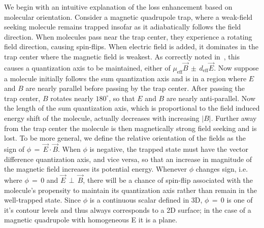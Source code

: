 \documentclass[%
 reprint,
 amsmath,amssymb,
 aps,
prl,
]{revtex4-1}
\newcommand{\epb}{{$\vec{E}\,{\perp}\,\vec{B}$}}
\begin{document}
We begin with an intuitive explanation of the loss enhancement based on molecular orientation.
Consider a magnetic quadrupole trap, where a weak-field seeking molecule remains trapped insofar as it adiabatically follows the field direction. 
When molecules pass near the trap center, they experience a rotating field direction, causing spin-flips. 
When electric field is added, it dominates in the trap center where the magnetic field is weakest. 
As correctly noted in~\cite{Bohn2013}, this causes a quantization axis to be maintained, either of $\mu_\text{eff}\vec{B}\,{\pm}\, d_\text{eff}\vec{E}$.
Now suppose a molecule initially follows the sum quantization axis and is in a region where $E$ and $B$ are nearly parallel before passing by the trap center.
After passing the trap center, $B$ rotates nearly $180^\circ$, so that $E$ and $B$ are nearly anti-parallel. 
Now the length of the sum quantization axis, which is proportional to the field induced energy shift of the molecule, actually decreases with increasing $|B|$.
Further away from the trap center the molecule is then magnetically strong field seeking and is lost. 
To be more general, we define the relative orientation of the fields as the sign of $\phi\,{=}\,\vec{E}\cdot\vec{B}$. 
When $\phi$ is negative, the trapped state must have the vector difference quantization axis, and vice versa, so that an increase in magnitude of the magnetic field increases its potential energy. 
Whenever $\phi$ changes sign, i.e. where $\phi\,{=}\,0$ and \epb, there will be a chance of spin-flip associated with the molecule's propensity to maintain its quantization axis rather than remain in the well-trapped state.
Since $\phi$ is a continuous scalar defined in 3D, $\phi\,{=}\,0$ is one of it's contour levels and thus always corresponds to a 2D surface; in the case of a magnetic quadrupole with homogeneous E it is a plane.
\end{document}
